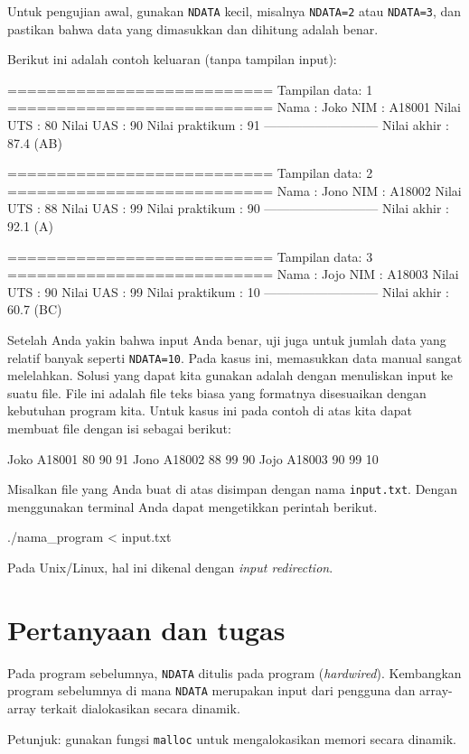 \documentclass[a4paper,11pt]{extarticle}
\begin{document}
Untuk pengujian awal, gunakan \texttt{NDATA} kecil, misalnya \texttt{NDATA=2} atau
\texttt{NDATA=3}, dan pastikan bahwa data yang dimasukkan dan dihitung adalah benar.

Berikut ini adalah contoh keluaran (tanpa tampilan input):
\begin{textcode}
===========================
Tampilan data: 1
===========================
Nama            : Joko
NIM             : A18001
Nilai UTS       : 80
Nilai UAS       : 90
Nilai praktikum : 91
---------------------------
Nilai akhir     : 87.4 (AB)

===========================
Tampilan data: 2
===========================
Nama            : Jono
NIM             : A18002
Nilai UTS       : 88
Nilai UAS       : 99
Nilai praktikum : 90
---------------------------
Nilai akhir     : 92.1 (A)

===========================
Tampilan data: 3
===========================
Nama            : Jojo
NIM             : A18003
Nilai UTS       : 90
Nilai UAS       : 99
Nilai praktikum : 10
---------------------------
Nilai akhir     : 60.7 (BC)
\end{textcode}

Setelah Anda yakin bahwa input Anda benar, uji juga untuk jumlah data yang relatif
banyak seperti \texttt{NDATA=10}. Pada kasus ini, memasukkan data manual sangat melelahkan.
Solusi yang dapat kita gunakan adalah dengan menuliskan input ke suatu file.
File ini adalah file teks biasa yang formatnya disesuaikan dengan kebutuhan program
kita. Untuk kasus ini pada contoh di atas kita dapat membuat file dengan isi sebagai
berikut:
\begin{textcode}
Joko A18001 80 90 91
Jono A18002 88 99 90
Jojo A18003 90 99 10
\end{textcode}
Misalkan file yang Anda buat di atas disimpan dengan nama \texttt{input.txt}.
Dengan menggunakan terminal Anda dapat mengetikkan perintah berikut.
\begin{textcode}
./nama_program < input.txt
\end{textcode}
Pada Unix/Linux, hal ini dikenal dengan \textit{input redirection}.

\section{Pertanyaan dan tugas}

Pada program sebelumnya, \texttt{NDATA} ditulis pada program
(\textit{hardwired}). Kembangkan program sebelumnya di mana \texttt{NDATA}
merupakan input dari pengguna dan array-array terkait dialokasikan secara
dinamik.

Petunjuk: gunakan fungsi \texttt{malloc} untuk mengalokasikan memori secara dinamik.
\end{document}
